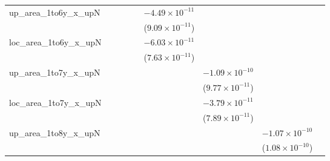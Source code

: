\begin{tabular}{lcccccccc}
   up\_area\_1to6y\_x\_upN      &                          &                          &                          &                          & $-4.49\times 10^{-11}$   &                          &                          &   \\   
                                &                          &                          &                          &                          & ($9.09\times 10^{-11}$)  &                          &                          &   \\   
   loc\_area\_1to6y\_x\_upN     &                          &                          &                          &                          & $-6.03\times 10^{-11}$   &                          &                          &   \\   
                                &                          &                          &                          &                          & ($7.63\times 10^{-11}$)  &                          &                          &   \\   
   up\_area\_1to7y\_x\_upN      &                          &                          &                          &                          &                          & $-1.09\times 10^{-10}$   &                          &   \\   
                                &                          &                          &                          &                          &                          & ($9.77\times 10^{-11}$)  &                          &   \\   
   loc\_area\_1to7y\_x\_upN     &                          &                          &                          &                          &                          & $-3.79\times 10^{-11}$   &                          &   \\   
                                &                          &                          &                          &                          &                          & ($7.89\times 10^{-11}$)  &                          &   \\   
   up\_area\_1to8y\_x\_upN      &                          &                          &                          &                          &                          &                          & $-1.07\times 10^{-10}$   &   \\   
                                &                          &                          &                          &                          &                          &                          & ($1.08\times 10^{-10}$)  &   \\   

\end{tabular}

